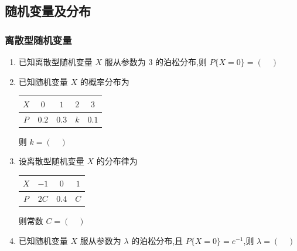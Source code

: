 \subsection{随机变量及分布}

\subsubsection{离散型随机变量}

\begin{enumerate}
\item 已知离散型随机变量 $X$ 服从参数为 $3$ 的泊松分布,则 $P\{X=0\}=(\quad)$
\item 已知随机变量 $X$ 的概率分布为
\begin{center}
\begin{tabular}{c|cccc}
\toprule
$X$ & $0$ & $1$ & $2$ & $3$ \\
\midrule
$P$ & $0.2$ & $0.3$ & $k$ & $0.1$ \\
\bottomrule
\end{tabular}
\end{center}
则 $k=(\quad)$
\item 设离散型随机变量 $X$ 的分布律为
\begin{center}
\begin{tabular}{c|ccc}
\toprule
$X$ & $-1$ & $0$ & $1$ \\
\midrule
$P$ & $2C$ & $0.4$ & $C$ \\
\bottomrule
\end{tabular}
\end{center}
则常数 $C=(\quad)$
\item 已知随机变量 $X$ 服从参数为 $\lambda$ 的泊松分布,且 $P\{X=0\}=e^{-1}$,则 $\lambda=(\quad)$

\end{enumerate}
